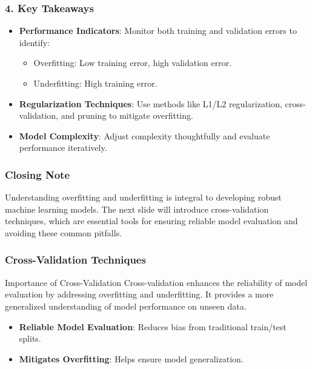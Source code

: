 \documentclass[aspectratio=169]{beamer}
\begin{document}
\begin{frame}[fragile]
  \frametitle{4. Key Takeaways}
  \begin{itemize}
    \item \textbf{Performance Indicators}: Monitor both training and validation errors to 
    identify:
    \begin{itemize}
      \item Overfitting: Low training error, high validation error.
      \item Underfitting: High training error.
    \end{itemize}
    
    \item \textbf{Regularization Techniques}: Use methods like L1/L2 regularization, 
    cross-validation, and pruning to mitigate overfitting.
    
    \item \textbf{Model Complexity}: Adjust complexity thoughtfully and evaluate 
    performance iteratively.
  \end{itemize}
\end{frame}

\begin{frame}[fragile]
  \frametitle{Closing Note}
  Understanding overfitting and underfitting is integral to developing robust machine 
  learning models. The next slide will introduce cross-validation techniques, which are 
  essential tools for ensuring reliable model evaluation and avoiding these common pitfalls.
\end{frame}

\begin{frame}[fragile]
    \frametitle{Cross-Validation Techniques}
    \begin{block}{Importance of Cross-Validation}
        Cross-validation enhances the reliability of model evaluation by addressing overfitting and underfitting. It provides a more generalized understanding of model performance on unseen data.
    \end{block}
    
    \begin{itemize}
        \item \textbf{Reliable Model Evaluation}: Reduces bias from traditional train/test splits.
        \item \textbf{Mitigates Overfitting}: Helps ensure model generalization.
    \end{itemize}
\end{frame}
\end{document}
